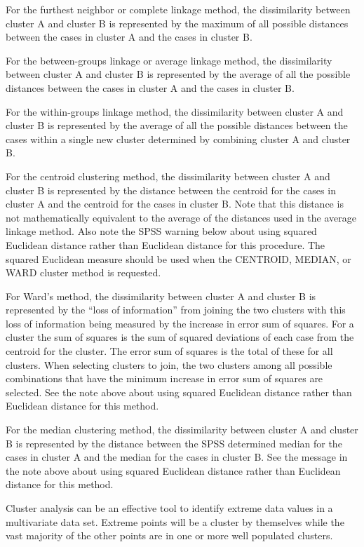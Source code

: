 For the furthest neighbor or complete linkage method, the dissimilarity between cluster A and cluster B is represented by the maximum of all possible distances between the cases in cluster A and the cases in cluster B.

For the between-groups linkage or average linkage method, the dissimilarity between cluster A and cluster B is represented by the average of all the possible distances between the cases in cluster A and the cases in cluster B.

For the within-groups linkage method, the dissimilarity between cluster A and cluster B is represented by the average of all the possible distances between the cases within a single new cluster determined by combining cluster A and cluster B.
 
For the centroid clustering method, the dissimilarity between cluster A and cluster B is represented by the distance between the centroid for the cases in cluster A and the centroid for the cases in cluster B.  Note that this distance is not mathematically equivalent to the average of the distances used in the average linkage method.  Also note the SPSS warning below about using squared Euclidean distance rather than Euclidean distance for this procedure.
The squared Euclidean measure should be used when the CENTROID, MEDIAN, or WARD cluster method is requested.

For Ward’s method, the dissimilarity between cluster A and cluster B is represented by the “loss of information” from joining the two clusters with this loss of information being measured by the increase in error sum of squares.  For a cluster the sum of squares is the sum of squared deviations of each case from the centroid for the cluster.  The error sum of squares is the total of these for all clusters.  When selecting clusters to join, the two clusters among all possible combinations that have the minimum increase in error sum of squares are selected.  See the note above about using squared Euclidean distance rather than Euclidean distance for this method.

For the median clustering method, the dissimilarity between cluster A and cluster B is represented by the distance between the SPSS determined median for the cases in cluster A and the median for the cases in cluster B.  See the message in the note above about using squared Euclidean distance rather than Euclidean distance for this method.

Cluster analysis can be an effective tool to identify extreme data values in a multivariate data set.  Extreme points will be a cluster by themselves while the vast majority of the other points are in one or more well populated clusters.  

